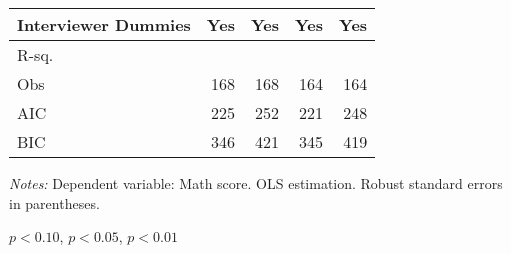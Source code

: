 \begin{table}[!h]
\begin{threeparttable}
\begin{tabular}{l*{4}{D{.}{.}{-1}}}
Interviewer Dummies &                 Yes   &                 Yes   &                 Yes   &                 Yes   \\
\midrule
R-sq.               &                       &                       &                       &                       \\
Obs                 &                 168   &                 168   &                 164   &                 164   \\
AIC                 &                 225   &                 252   &                 221   &                 248   \\
BIC                 &                 346   &                 421   &                 345   &                 419   \\
\bottomrule
\end{tabular}
\begin{tablenotes}
\footnotesize
\item \textit{Notes:} Dependent variable: Math score. OLS estimation. Robust standard errors in parentheses.
\item \sym{*} \(p<0.10\), \sym{**} \(p<0.05\), \sym{***} \(p<0.01\)
\end{tablenotes}
\end{threeparttable}
\label{tab:revcause_maxchoice}
\end{table}
